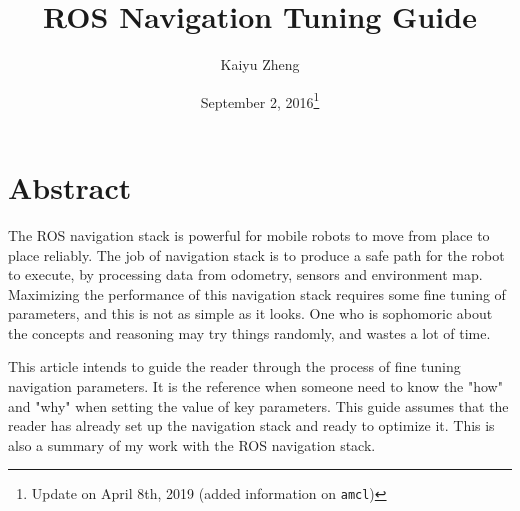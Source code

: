\documentclass[12pt]{article}
\author{Kaiyu Zheng}
\date{September 2, 2016\footnote{Update on April 8th, 2019 (added information on \texttt{amcl})}}
\title{ROS Navigation Tuning Guide}
\begin{document}
\maketitle

\section*{Abstract}
The ROS navigation stack is powerful for mobile robots to move from place to place reliably. The job of navigation stack is to produce a safe path for the robot to execute, by processing data from odometry, sensors and environment map. Maximizing the performance of this navigation stack requires some fine tuning of parameters, and this is not as simple as it looks. One who is sophomoric about the concepts and reasoning may try things randomly, and wastes a lot of time.

This article intends to guide the reader through the process of fine tuning navigation parameters. It is the reference when someone need to know the "how" and "why" when setting the value of key parameters. This guide assumes that the reader has already set up the navigation stack and ready to optimize it. This is also a summary of my work with the ROS navigation stack.\\
\end{document}
